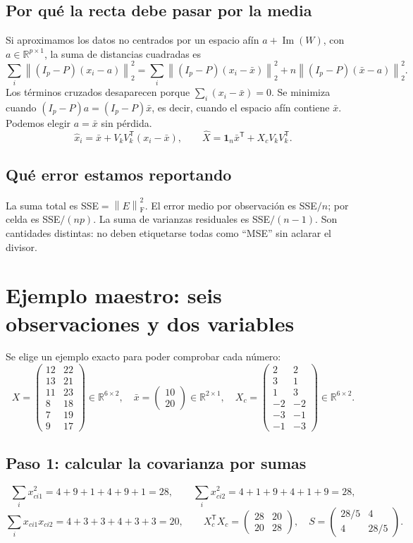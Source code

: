 \documentclass[11pt,a4paper]{article}
\newcommand{\R}{\mathbb R}
\newcommand{\T}{^{\mathsf T}}
\newcommand{\norm}[1]{\left\lVert #1\right\rVert}
\DeclareMathOperator{\range}{Im}
\newcommand{\F}{_{\mathrm F}}
\newcommand{\ones}{\mathbf 1}
\theoremstyle{definition}
\begin{document}
\subsection{Por qué la recta debe pasar por la media}
Si aproximamos los datos no centrados por un espacio afín $a+\range(W)$, con $a\in\R^{p\times1}$, la suma de distancias cuadradas es
\[
\sum_i\norm{(I_p-P)(x_i-a)}_2^2
=\sum_i\norm{(I_p-P)(x_i-\bar x)}_2^2+n\norm{(I_p-P)(\bar x-a)}_2^2.
\]
Los términos cruzados desaparecen porque $\sum_i(x_i-\bar x)=0$. Se minimiza cuando $(I_p-P)a=(I_p-P)\bar x$, es decir, cuando el espacio afín contiene $\bar x$. Podemos elegir $a=\bar x$ sin pérdida.
\[
\widehat x_i=\bar x+V_kV_k\T(x_i-\bar x),\qquad
\widehat X=\ones_n\bar x\T+X_cV_kV_k\T.
\]
\subsection{Qué error estamos reportando}
La suma total es SSE$=\norm E\F^2$. El error medio por observación es SSE$/n$; por celda es SSE$/(np)$. La suma de varianzas residuales es SSE$/(n-1)$. Son cantidades distintas: no deben etiquetarse todas como ``MSE'' sin aclarar el divisor.

\section{Ejemplo maestro: seis observaciones y dos variables}
\label{sec:ejemplo2d}
Se elige un ejemplo exacto para poder comprobar cada número:
\[
X=\begin{pmatrix}12&22\\13&21\\11&23\\8&18\\7&19\\9&17\end{pmatrix}\in\R^{6\times2},\quad
\bar x=\begin{pmatrix}10\\20\end{pmatrix}\in\R^{2\times1},\quad
X_c=\begin{pmatrix}2&2\\3&1\\1&3\\-2&-2\\-3&-1\\-1&-3\end{pmatrix}\in\R^{6\times2}.
\]
\subsection{Paso 1: calcular la covarianza por sumas}
\[
\sum_i x_{ci1}^2=4+9+1+4+9+1=28,\qquad
\sum_i x_{ci2}^2=4+1+9+4+1+9=28,
\]
\[
\sum_i x_{ci1}x_{ci2}=4+3+3+4+3+3=20,\qquad
X_c\T X_c=\begin{pmatrix}28&20\\20&28\end{pmatrix},\quad
S=\begin{pmatrix}28/5&4\\4&28/5\end{pmatrix}.
\]
\end{document}
